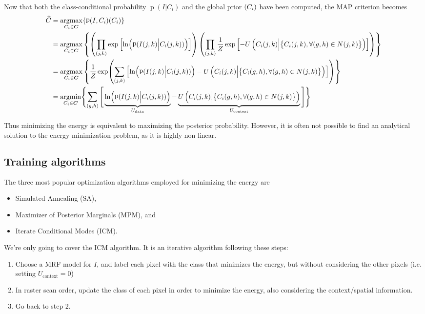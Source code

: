 \documentclass[oneside,onecolumn]{report}
\DeclareMathOperator*{\argmax}{argmax}
\DeclareMathOperator*{\argmin}{argmin}
\DeclareMathOperator*{\pdf}{p}
\let\P\relax
\DeclareMathOperator*{\P}{P}
\begin{document}
Now that both the class-conditional probability $\pdf(I | C_i)$ and the global prior $\P(C_i)$ have been computed, the MAP criterion becomes
\begin{align*}
    \widehat C
    &= \argmax_{C_i \in \bm C}\{ \pdf(I, C_i) \P(C_i) \} \\
    &= \argmax_{C_i \in \bm C}
    \left\{
        \left( \prod_{(j, k)} \exp\left[\ln(\pdf(I(j, k) \Big| C_i(j, k)))\right] \right)
        \left( \prod_{(j, k)} \frac{1}{Z} \exp\left[-U \left( C_i(j, k) \Big| \big\{ C_i(j, k), \forall (g, h) \in N(j, k) \big\} \right)\right] \right)
    \right\} \\
    &= \argmax_{C_i \in \bm C}
    \left\{
    \frac{1}{Z}
    \exp(
        \sum_{(j, k)} \left[
            \ln(\pdf(I(j, k) \Big| C_i(j, k)))
            -U \left( C_i(j, k) \Big| \big\{ C_i(g, h), \forall (g, h) \in N(j, k) \big\} \right)
        \right]
    )
    \right\} \\
    &= \argmin_{C_i \in \bm C}
    \Biggl\{
        \sum_{(g, h)} \Bigg[
            \underbrace{\ln(\pdf(I(j, k) \Big| C_i(j, k)))}_{U_\text{data}}
            -
            \underbrace{U \left( C_i(j, k) \Big| \big\{ C_i(g, h), \forall (g, h) \in N(j, k) \big\} \right)}_{U_\text{context}}
        \Bigg]
    \Biggr\}
\end{align*}

Thus minimizing the energy is equivalent to maximizing the posterior probability.
However, it is often not possible to find an analytical solution to the energy minimization problem, as it is highly non-linear.


\subsection{Training algorithms}
The three most popular optimization algorithms employed for minimizing the energy are
\begin{itemize}
    \item Simulated Annealing (SA),
    \item Maximizer of Posterior Marginals (MPM), and
    \item Iterate Conditional Modes (ICM).
\end{itemize}

We're only going to cover the ICM algorithm.
It is an iterative algorithm following these steps:
\begin{enumerate}
    \item Choose a MRF model for $I$, and label each pixel with the class that minimizes the energy, but without considering the other pixels (i.e. setting $U_\text{context} = 0$)
    \item In raster scan order, update the class of each pixel in order to minimize the energy, also considering the context/spatial information.
    \item Go back to step 2.
\end{enumerate}
\end{document}
